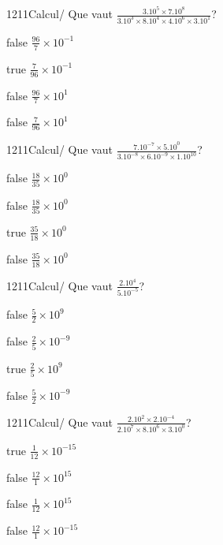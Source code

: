             \begin{question}{1211}{Calcul}{}{/}
                Que vaut $\frac{3.10^{5}\times 7.10^{8}}{3.10^{3}\times 8.10^{4}\times 4.10^{6}\times 3.10^{1}}$?
            \end{question}
            \begin{reponses}
                \item[false] $\frac{96}{7}\times 10^{-1}$
                \item[true] $\frac{7}{96}\times 10^{-1}$
                \item[false] $\frac{96}{7}\times 10^{1}$
                \item[false] $\frac{7}{96}\times 10^{1}$
            \end{reponses}
            \begin{question}{1211}{Calcul}{}{/}
                Que vaut $\frac{7.10^{-7}\times 5.10^{0}}{3.10^{-8}\times 6.10^{-9}\times 1.10^{10}}$?
            \end{question}
            \begin{reponses}
                \item[false] $\frac{18}{35}\times 10^{0}$
                \item[false] $\frac{18}{35}\times 10^{0}$
                \item[true] $\frac{35}{18}\times 10^{0}$
                \item[false] $\frac{35}{18}\times 10^{0}$
            \end{reponses}
            \begin{question}{1211}{Calcul}{}{/}
                Que vaut $\frac{2.10^{4}}{5.10^{-5}}$?
            \end{question}
            \begin{reponses}
                \item[false] $\frac{5}{2}\times 10^{9}$
                \item[false] $\frac{2}{5}\times 10^{-9}$
                \item[true] $\frac{2}{5}\times 10^{9}$
                \item[false] $\frac{5}{2}\times 10^{-9}$
            \end{reponses}
            \begin{question}{1211}{Calcul}{}{/}
                Que vaut $\frac{2.10^{2}\times 2.10^{-4}}{2.10^{7}\times 8.10^{6}\times 3.10^{0}}$?
            \end{question}
            \begin{reponses}
                \item[true] $\frac{1}{12}\times 10^{-15}$
                \item[false] $\frac{12}{1}\times 10^{15}$
                \item[false] $\frac{1}{12}\times 10^{15}$
                \item[false] $\frac{12}{1}\times 10^{-15}$
            \end{reponses}
